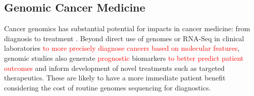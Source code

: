 



\subsection{Genomic Cancer Medicine}
Cancer \glspl{genomic} has substantial potential for impacts in cancer medicine: from diagnosis to treatment \citep{Roychowdhury2016, Tran2012}. Beyond direct use of \glspl{genome} or \gls{RNA-Seq} in clinical laboratories \textcolor{red}{to more precisely diagnose cancers based on molecular features}, \gls{genomic} studies also generate \textcolor{red}{prognostic} biomarkers \textcolor{red}{to better predict patient outcomes} and inform development of novel \glspl{treatment} such as targeted therapeutics. These are likely to have a more immediate patient benefit considering the cost of routine \glspl{genome} sequencing for diagnostics. %

